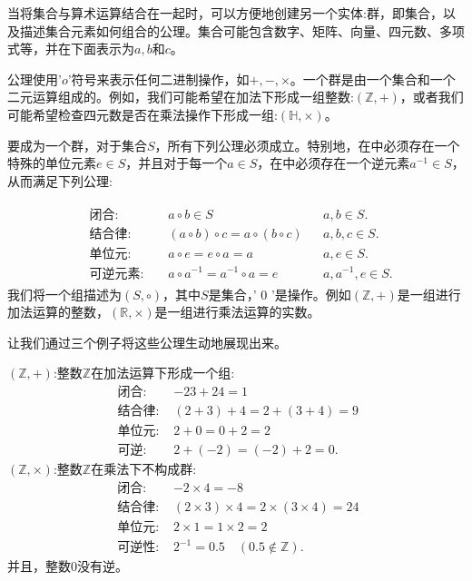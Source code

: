 当将集合与算术运算结合在一起时，可以方便地创建另一个实体:群，即集合，以及描述集合元素如何组合的公理。集合可能包含数字、矩阵、向量、四元数、多项式等，并在下面表示为$a,b$和$c$。

公理使用'$o$'符号来表示任何二进制操作，如$+,-, \times$。一个群是由一个集合和一个二元运算组成的。例如，我们可能希望在加法下形成一组整数:$(\mathbb{Z},+)$，或者我们可能希望检查四元数是否在乘法操作下形成一组:$(\mathbb{H}, \times)$。

要成为一个群，对于集合$S$，所有下列公理必须成立。特别地，在中必须存在一个特殊的单位元素$e \in S$，并且对于每一个$a \in S$，在中必须存在一个逆元素$a^{-1} \in S$，从而满足下列公理:

\begin{align*}
    \begin{aligned}
        & \textbf{闭合: }        && a \circ b \in S && a,b \in S.\\
        & \textbf{结合律: }  && (a \circ b) \circ c=a \circ(b \circ c) && a, b, c \in S.\\
        & \textbf{单位元:}    && a \circ e=e \circ a=a && a, e \in S.\\
        & \textbf{可逆元素: }    && a  \circ a^{-1}=a^{-1} \circ a=e && a, a^{-1}, e \in S.
    \end{aligned}
\end{align*}
我们将一个组描述为$(S, \circ)$，其中$S$是集合，' 0 '是操作。例如$(\mathbb{Z},+)$是一组进行加法运算的整数，$(\mathbb{R}, \times)$是一组进行乘法运算的实数。

让我们通过三个例子将这些公理生动地展现出来。

$(\mathbb{Z},+)$:整数$\mathbb{Z}$在加法运算下形成一个组:
$$
\begin{aligned}
\text { 闭合: } & -23+24=1 \\
\text { 结合律: } & (2+3)+4=2+(3+4)=9 \\
\text { 单位元: } & 2+0=0+2=2 \\
\text { 可逆: } & 2+(-2)=(-2)+2=0 .
\end{aligned}
$$
$(\mathbb{Z}, \times)$:整数$\mathbb{Z}$在乘法下不构成群:
$$
\begin{aligned}
\text { 闭合: } & -2 \times 4=-8 \\
\text { 结合律: } & (2 \times 3) \times 4=2 \times(3 \times 4)=24 \\
\text { 单位元: } & 2 \times 1=1 \times 2=2 \\
\text { 可逆性: } & 2^{-1}=0.5 \quad(0.5 \notin \mathbb{Z}) .
\end{aligned}
$$
并且，整数0没有逆。

